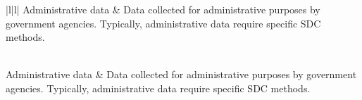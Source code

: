\documentclass[letterpaper,10pt,english]{sphinxmanual}
\begin{document}
\begin{savenotes}\sphinxatlongtablestart\begin{longtable}{|l|l|}
\hline
\sphinxstyletheadfamily 
Administrative data
&\sphinxstyletheadfamily 
Data collected for administrative
purposes by government agencies.
Typically, administrative data
require specific SDC methods.
\\
\hline
\endfirsthead

%
{}\\
\hline
\sphinxstyletheadfamily 
Administrative data
&\sphinxstyletheadfamily 
Data collected for administrative
purposes by government agencies.
Typically, administrative data
require specific SDC methods.
\\
\hline
\endhead

\hline
{}\\
\endfoot

\endlastfoot


\end{longtable}
\end{savenotes}
\end{document}

